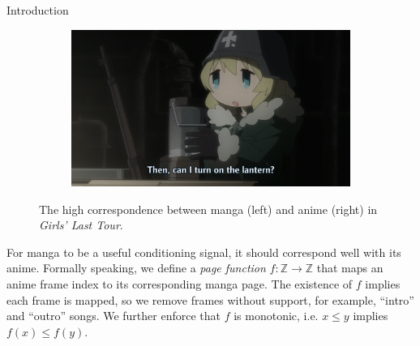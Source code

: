 \documentclass{beamer}                             %
\begin{document}
\begin{frame}
\begin{columns}
\begin{column}{0.33\textwidth}
\begin{block}{Introduction}
\begin{figure}[h!]
\begin{subfigure}[h]{0.49 \textwidth}
                \includegraphics[scale=0.28,trim={160px 0 300px 0},clip]{frame}
              \end{subfigure} 
              \caption{The high correspondence between manga (left)
                and anime (right) in \textit{Girls' Last Tour}.}
              \label{fig:dual}
          \end{figure}

        For manga to be a useful conditioning signal, it should correspond well
        with its anime. Formally speaking, we define a \textit{page function}
        \( f: \mathbb{Z} \to \mathbb{Z} \) that maps an anime frame index to
        its corresponding manga page. The existence of \( f \) implies each
        frame is mapped, so we remove frames without support, for example,
        \enquote{intro} and \enquote{outro} songs. We further enforce that \( f
        \) is monotonic, i.e. \( x \leq y \) implies \( f(x) \leq f(y) \). 

      \end{block}

    \end{column}



\end{columns}
\end{frame}
\end{document}

